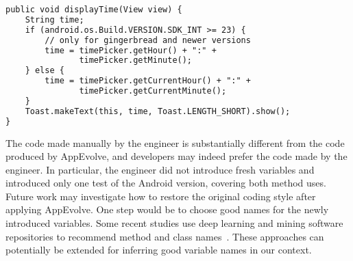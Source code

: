 \vspace{0.2cm}
\begin{lstlisting}[language=diff,numbers=none]
public void displayTime(View view) {
    String time;
    if (android.os.Build.VERSION.SDK_INT >= 23) {
        // only for gingerbread and newer versions
        time = timePicker.getHour() + ":" +
               timePicker.getMinute();
    } else {
        time = timePicker.getCurrentHour() + ":" +
               timePicker.getCurrentMinute();
    }
    Toast.makeText(this, time, Toast.LENGTH_SHORT).show();
}
\end{lstlisting}


\vspace{0.5cm}The code made manually by the engineer is substantially
different from the code produced by AppEvolve, and developers may indeed
prefer the code made by the engineer. In particular, the engineer did not
introduce fresh variables and introduced only one test of the Android
version, covering both method uses.  Future work may investigate how to
restore the original coding style after applying AppEvolve. One step would
be to choose good names for the newly introduced variables. Some recent
studies use deep learning and mining software repositories to recommend
method and class names~\cite{allamanis2015suggesting}. These approaches can
potentially be extended for inferring good variable names in our context.
